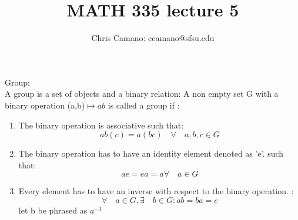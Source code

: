 \documentclass[11pt]{article}
\author{Chris Camano: ccamano@sfsu.edu}
\title{MATH 335  lecture 5 }
\date
\theoremstyle{definition}  %
\begin{document}
\maketitle
{} Group: \\
A group is a set of objects and a binary relation: A  non empty set G with a binary operation (a,b)$\mapsto ab$ is called a group if :
\begin{enumerate}
  \item The binary operation is associative such that:
  \[
    ab(c)=a(bc)\quad \forall \quad a,b,c \in G
  \]
  \item
  The binary operation has to have an identity element denoted as 'e'. such that:
\[
  ae=ea=a \forall \quad a \in G
\]
  \item
  Every element has to have an inverse with respect to the binary operation. :
  \[
    \forall \quad a \in G , \exists\quad  b \in G : ab=ba=e
  \]
  let b be phrased as $a^{-1}$ 
\end{enumerate}
\end{document}
